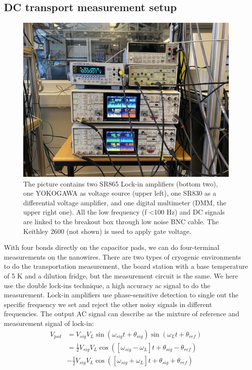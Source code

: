 \subsection{DC transport measurement setup}
\begin{figure}[h!]
    \centering
    \includegraphics[scale=0.2]{Pic/DCmsmt.jpg}
    \caption{The picture contains two SR865 Lock-in amplifiers (bottom two), one YOKOGAWA as voltage source (upper left), one SR830 as a differential voltage amplifier, and one digital multimeter (DMM, the upper right one). All the low frequency (f <100 Hz) and DC signals are linked to the breakout box through low noise BNC cable. The Keithley 2600 (not shown) is used to apply gate voltage.}
    \label{DCmsmt}
\end{figure}
With four bonds directly on the capacitor pads, we can do four-terminal measurements on the nanowires. There are two types of cryogenic environments to do the transportation measurement, the board station with a base temperature of 5 K and a dilution fridge, but the measurement circuit is the same. We here use the double lock-ins technique, a high accuracy ac signal to do the measurement. Lock-in amplifiers use phase-sensitive detection\cite{RN42} to single out the specific frequency we set and reject the other noisy signals in different frequencies. The output AC signal can describe as the mixture of reference and measurement signal of lock-in:
\begin{equation}
\begin{array}{cc}
         V_{psd} &= V_{sig}V_L\sin(\omega_{sig}t+\theta_{sig})\sin(\omega_L t +\theta_{ref})  \\
     & = \frac{1}{2}V_{sig}V_L\cos{([\omega_{sig}-\omega_L]t+\theta_{sig} - \theta_{ref})} \\
     &-\frac{1}{2}V_{sig}V_L\cos{([\omega_{sig}+\omega_L]t+\theta_{sig} + \theta_{ref})}
\end{array}
\end{equation}
